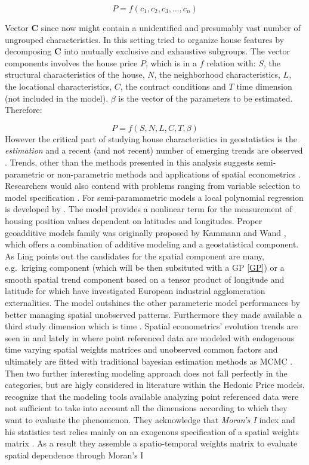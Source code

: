 \documentclass[
  12pt,
  a4paper,
  oneside]{book}
\theoremstyle{definition}
\theoremstyle{definition}
\theoremstyle{definition}
\theoremstyle{remark}
\begin{document}
\[P=f\left(c_{1}, c_{2}, c_{3}, \ldots, c_{n}\right)\]

Vector \(\mathbf{C}\) since now might contain a unidentified and presumably vast number of ungrouped characteristics. In this setting \citet{Malpezzi} tried to organize house features by decomposing \(\mathbf{C}\) into mutually exclusive and exhaustive subgroups. The vector components involves the house price \(P\), which is in a \(f\) relation with: \(S\), the structural characteristics of the house, \(N\), the neighborhood characteristics, \(L\), the locational characteristics, \(C\), the contract conditions and \(T\) time dimension (not included in the model). \(\beta\) is the vector of the parameters to be estimated. Therefore:

\[P=f\left(S, N, L, C, T, \beta\right)\] However the critical part of studying house characteristics in geostatistics is the \emph{estimation} and a recent (and not recent) number of emerging trends are observed \citep{SHEPPARD19991595}. Trends, other than the methods presented in this analysis suggests semi-parametric or non-parametric methods and applications of spatial econometrics \citet{Ling}. Researchers would also contend with problems ranging from variable selection to model specification \citeyearpar{Ling}. For semi-paramametric models a local polynomial regression is developed by \citet{clapp}. The model provides a nonlinear term for the measurement of housing position values dependent on latitudes and longitudes. Proper geoadditive models family was originally proposed by Kammann and Wand \citeyearpar{kammanwand}, which offers a combination of additive modeling \citep{buja1989} and a geostatistical component. As Ling \citeyearpar{Ling} points out the candidates for the spatial component are many, e.g.~kriging component \citep{dey2017metamodel} (which will be then subsituted with a GP \ref{GP}) or a smooth spatial trend component based on a tensor product of longitude and latitude for which \citet{basilebenfratmcast} have investigated European industrial agglomeration externalities. The model outshines the other parameteric model performances by better managing spatial unobserved patterns. Furthermore they made available a third study dimension which is time \citeyearpar{Ling}. Spatial econometrics' evolution trends are seen in \citet{spateconomshifei} and lately in \citet{spateconanslein} where point referenced data are modeled with endogenous time varying spatial weights matrices and unobserved common factors and ultimately are fitted with traditional bayesian estimation methods as MCMC \citeyearpar{spateconanslein}. Then two further interesting modeling approach does not fall perfectly in the categories, but are higly considered in literature within the Hedonic Price models. \citet{dubelegros} recognize that the modeling tools available analyzing point referenced data were not sufficient to take into account all the dimensions according to which they want to evaluate the phenomenon. They acknowledge that \emph{Moran's I} index and his statistics test relies mainly on an exogenous specification of a spatial weights matrix \citeyearpar{dubelegros}. As a result they assemble a spatio‐temporal weights matrix to evaluate spatial dependence through Moran's I 
\end{document}
